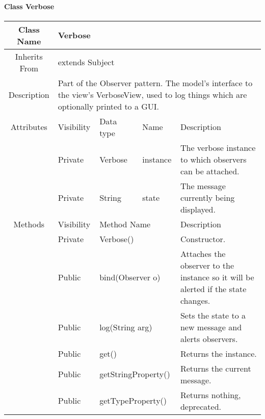 \paragraph{Class Verbose}\mbox{}
\begin{tabularx}{\textwidth}{|c||l|l|l|X|}
    \hline
    \cellcolor{lightgray}Class Name & \multicolumn{4}{X|}{Verbose}\\
    \hline
    \cellcolor{lightgray}Inherits From & \multicolumn{4}{X|}{extends Subject}\\
    \hline
    \cellcolor{lightgray}Description & \multicolumn{4}{p{12cm}|}{Part of the Observer pattern. The model's interface to the view's VerboseView, used to log things which are optionally printed to a GUI.}\\

    \hline\hline
    \cellcolor{lightgray}Attributes & \cellcolor{lightgray}Visibility & \cellcolor{lightgray}Data type & \cellcolor{lightgray}Name & \cellcolor{lightgray}Description\\\cline{2-5}
    \cellcolor{lightgray} & Private & Verbose & instance & The verbose instance to which observers can be attached.\\\cline{2-5}
    \cellcolor{lightgray} & Private & String & state & The message currently being displayed.\\ 
    \hline\hline
    \cellcolor{lightgray}Methods & \cellcolor{lightgray}Visibility & \multicolumn{2}{l|}{\cellcolor{lightgray}Method Name} & \cellcolor{lightgray}Description\\\cline{2-5}
    \hline
    \cellcolor{lightgray} & Private & \multicolumn{2}{l|}{Verbose()} & Constructor.\\
    \hline
    \cellcolor{lightgray} & Public & \multicolumn{2}{l|}{bind(Observer o)} & Attaches the observer to the instance so it will be alerted if the state changes. \\
    \hline
    \cellcolor{lightgray} & Public & \multicolumn{2}{l|}{log(String arg)} & Sets the state to a new message and alerts observers. \\
    \hline
    \cellcolor{lightgray} & Public & \multicolumn{2}{l|}{get()} & Returns the instance.\\
    \hline
    \cellcolor{lightgray} & Public & \multicolumn{2}{l|}{getStringProperty()} & Returns the current message.\\
    \hline
    \cellcolor{lightgray} & Public & \multicolumn{2}{l|}{getTypeProperty()} & Returns nothing, deprecated.\\
    \hline
\end{tabularx}